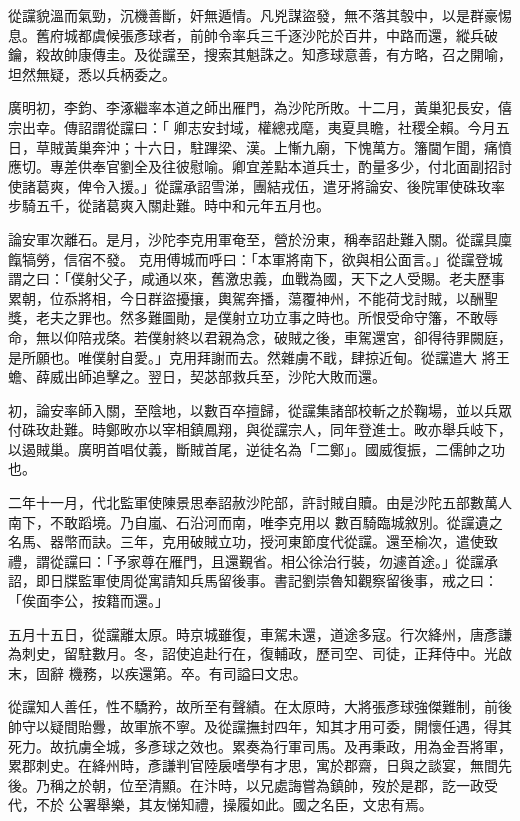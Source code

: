 \begin{pinyinscope}
 從讜貌溫而氣勁，沉機善斷，奸無遁情。凡兇謀盜發，無不落其彀中，以是群豪惕息。舊府城都虞候張彥球者，前帥令率兵三千逐沙陀於百井，中路而還，縱兵破鑰，殺故帥康傳圭。及從讜至，搜索其魁誅之。知彥球意善，有方略，召之開喻，坦然無疑，悉以兵柄委之。



 廣明初，李鈞、李涿繼率本道之師出雁門，為沙陀所敗。十二月，黃巢犯長安，僖宗出幸。傳詔謂從讜曰：「
 卿志安封域，權總戎麾，夷夏具瞻，社稷全賴。今月五日，草賊黃巢奔沖；十六日，駐蹕梁、漢。上慚九廟，下愧萬方。籓閫乍聞，痛憤應切。專差供奉官劉全及往彼慰喻。卿宜差點本道兵士，酌量多少，付北面副招討使諸葛爽，俾令入援。」從讜承詔雪涕，團結戎伍，遣牙將論安、後院軍使硃玫率步騎五千，從諸葛爽入關赴難。時中和元年五月也。



 論安軍次離石。是月，沙陀李克用軍奄至，營於汾東，稱奉詔赴難入關。從讜具廩餼犒勞，信宿不發。
 克用傅城而呼曰：「本軍將南下，欲與相公面言。」從讜登城謂之曰：「僕射父子，咸通以來，舊激忠義，血戰為國，天下之人受賜。老夫歷事累朝，位忝將相，今日群盜擾攘，輿駕奔播，蕩覆神州，不能荷戈討賊，以酬聖獎，老夫之罪也。然多難圖勛，是僕射立功立事之時也。所恨受命守籓，不敢辱命，無以仰陪戎棨。若僕射終以君親為念，破賊之後，車駕還宮，卻得待罪闕庭，是所願也。唯僕射自愛。」克用拜謝而去。然雜虜不戢，肆掠近甸。從讜遣大
 將王蟾、薛威出師追擊之。翌日，契苾部救兵至，沙陀大敗而還。



 初，論安率師入關，至陰地，以數百卒擅歸，從讜集諸部校斬之於鞠場，並以兵眾付硃玫赴難。時鄭畋亦以宰相鎮鳳翔，與從讜宗人，同年登進士。畋亦舉兵岐下，以遏賊巢。廣明首唱仗義，斷賊首尾，逆徒名為「二鄭」。國威復振，二儒帥之功也。



 二年十一月，代北監軍使陳景思奉詔赦沙陀部，許討賊自贖。由是沙陀五部數萬人南下，不敢蹈境。乃自嵐、石沿河而南，唯李克用以
 數百騎臨城敘別。從讜遺之名馬、器幣而訣。三年，克用破賊立功，授河東節度代從讜。還至榆次，遣使致禮，謂從讜曰：「予家尊在雁門，且還覲省。相公徐治行裝，勿遽首途。」從讜承詔，即日牒監軍使周從寓請知兵馬留後事。書記劉崇魯知觀察留後事，戒之曰：「俟面李公，按籍而還。」



 五月十五日，從讜離太原。時京城雖復，車駕未還，道途多寇。行次絳州，唐彥謙為刺史，留駐數月。冬，詔使追赴行在，復輔政，歷司空、司徒，正拜侍中。光啟末，固辭
 機務，以疾還第。卒。有司謚曰文忠。



 從讜知人善任，性不驕矜，故所至有聲績。在太原時，大將張彥球強傑難制，前後帥守以疑間貽釁，故軍旅不寧。及從讜撫封四年，知其才用可委，開懷任遇，得其死力。故抗虜全城，多彥球之效也。累奏為行軍司馬。及再秉政，用為金吾將軍，累郡刺史。在絳州時，彥謙判官陸扆嗜學有才思，寓於郡齋，日與之談宴，無間先後。乃稱之於朝，位至清顯。在汴時，以兄處誨嘗為鎮帥，歿於是郡，訖一政受代，不於
 公署舉樂，其友悌知禮，操履如此。國之名臣，文忠有焉。




\end{pinyinscope}

